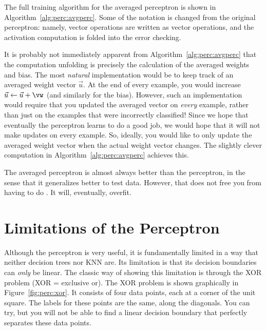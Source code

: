 The full training algorithm for the averaged perceptron is shown in
Algorithm~\ref{alg:perc:avgperc}.  Some of the notation is changed
from the original perceptron: namely, vector operations are written as
vector operations, and the activation computation is folded into the
error checking.

It is probably not immediately apparent from
Algorithm~\ref{alg:perc:avgperc} that the computation unfolding is
precisely the calculation of the averaged weights and bias.  The most
\emph{natural} implementation would be to keep track of an averaged
weight vector $\vec u$.  At the end of every example, you would
increase $\vec u \leftarrow \vec u + \vw$ (and similarly for the
bias).  However, such an implementation would require that you updated
the averaged vector on \emph{every} example, rather than just on the
examples that were incorrectly classified!  Since we hope that
eventually the perceptron learns to do a good job, we would hope that
it will not make updates on every example.  So, ideally, you would
like to only update the averaged weight vector when the actual weight
vector changes.  The slightly clever computation in
Algorithm~\ref{alg:perc:avgperc} achieves this.



The averaged perceptron is almost always better than the perceptron,
in the sense that it generalizes better to test data.  However, that
does not free you from having to do .  It
will, eventually, overfit.

\section{Limitations of the Perceptron}


Although the perceptron is very useful, it is fundamentally limited in
a way that neither decision trees nor KNN are.  Its limitation is that
its decision boundaries can \emph{only} be linear.  The classic way of
showing this limitation is through the XOR problem (XOR = exclusive
or).  The XOR problem is shown graphically in
Figure~\ref{fig:perc:xor}.  It consists of four data points, each at a
corner of the unit square.  The labels for these points are the same,
along the diagonals.  You can try, but you will not be able to find a
linear decision boundary that perfectly separates these data points.

